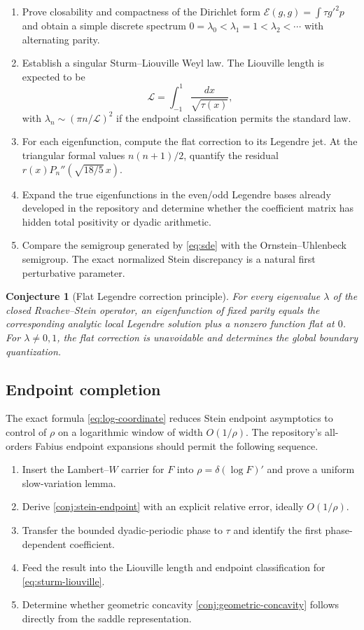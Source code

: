 \documentclass[11pt,oneside]{article}
\newtheorem{conjecture}[theorem]{Conjecture}
\theoremstyle{definition}
\theoremstyle{remark}
\begin{document}
\begin{enumerate}
\item Prove closability and compactness of the Dirichlet form
$\mathcal E(g,g)=\int\tau g'^2p$ and obtain a simple discrete spectrum
$0=\lambda_0<\lambda_1=1<\lambda_2<\cdots$ with alternating parity.
\item Establish a singular Sturm--Liouville Weyl law.  The Liouville length is
expected to be
\[
 \mathscr L=\int_{-1}^1\frac{dx}{\sqrt{\tau(x)}},
\]
with $\lambda_n\sim(\pi n/\mathscr L)^2$ if the endpoint classification permits
the standard law.
\item For each eigenfunction, compute the flat correction to its Legendre jet.
At the triangular formal values $n(n+1)/2$, quantify the residual
$r(x)P_n''(\sqrt{18/5}\,x)$.
\item Expand the true eigenfunctions in the even/odd Legendre bases already
developed in the repository and determine whether the coefficient matrix has
hidden total positivity or dyadic arithmetic.
\item Compare the semigroup generated by \eqref{eq:sde} with the Ornstein--Uhlenbeck
semigroup.  The exact normalized Stein discrepancy is a natural first perturbative
parameter.
\end{enumerate}

\begin{conjecture}[Flat Legendre correction principle]
For every eigenvalue $\lambda$ of the closed Rvachev--Stein operator, an
eigenfunction of fixed parity equals the corresponding analytic local Legendre
solution plus a nonzero function flat at $0$.  For $\lambda\ne0,1$, the flat
correction is unavoidable and determines the global boundary quantization.
\end{conjecture}

\subsection{Endpoint completion}
The exact formula \eqref{eq:log-coordinate} reduces Stein endpoint asymptotics to
control of $\rho$ on a logarithmic window of width $O(1/\rho)$.  The repository's
all-orders Fabius endpoint expansions should permit the following sequence.

\begin{enumerate}
\item Insert the Lambert--$W$ carrier for $F$ into
$\rho=\delta(\log F)'$ and prove a uniform slow-variation lemma.
\item Derive \cref{conj:stein-endpoint} with an explicit relative error, ideally
$O(1/\rho)$.
\item Transfer the bounded dyadic-periodic phase to $\tau$ and identify the first
phase-dependent coefficient.
\item Feed the result into the Liouville length and endpoint classification for
\eqref{eq:sturm-liouville}.
\item Determine whether geometric concavity
\cref{conj:geometric-concavity} follows directly from the saddle representation.
\end{enumerate}
\end{document}
